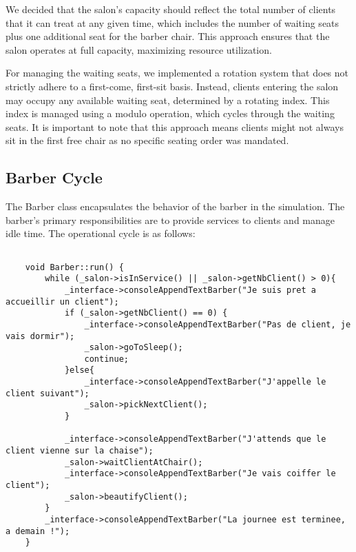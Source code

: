 \documentclass{article}
\begin{document}
    We decided that the salon's capacity should reflect the total number of clients that it can treat at any given time, which includes the number of waiting seats plus one additional seat for the barber chair. This approach ensures that the salon operates at full capacity, maximizing resource utilization.

    For managing the waiting seats, we implemented a rotation system that does not strictly adhere to a first-come, first-sit basis. Instead, clients entering the salon may occupy any available waiting seat, determined by a rotating index. This index is managed using a modulo operation, which cycles through the waiting seats. It is important to note that this approach means clients might not always sit in the first free chair as no specific seating order was mandated.

    \subsection{Barber Cycle}

    The Barber class encapsulates the behavior of the barber in the simulation. The barber's primary responsibilities are to provide services to clients and manage idle time. The operational cycle is as follows:

    \begin{lstlisting}[caption={The barber operational cycle}, captionpos=b, label=lst:1]

    void Barber::run() {
        while (_salon->isInService() || _salon->getNbClient() > 0){
            _interface->consoleAppendTextBarber("Je suis pret a accueillir un client");
            if (_salon->getNbClient() == 0) {
                _interface->consoleAppendTextBarber("Pas de client, je vais dormir");
                _salon->goToSleep();
                continue;
            }else{
                _interface->consoleAppendTextBarber("J'appelle le client suivant");
                _salon->pickNextClient();
            }

            _interface->consoleAppendTextBarber("J'attends que le client vienne sur la chaise");
            _salon->waitClientAtChair();
            _interface->consoleAppendTextBarber("Je vais coiffer le client");
            _salon->beautifyClient();
        }
        _interface->consoleAppendTextBarber("La journee est terminee, a demain !");
    }

    \end{lstlisting}
\end{document}
